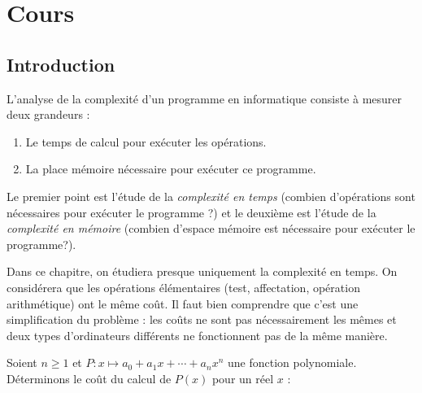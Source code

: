 \documentclass[french,11pt,twoside]{VcCours}
\begin{document}

\tableofcontents
\separationTitre


\section{Cours}

\subsection{Introduction}

L'analyse de la complexité d'un programme en informatique consiste 
à mesurer deux grandeurs :

\begin{enumerate}
\item Le temps de calcul pour exécuter les opérations.
\item La place mémoire nécessaire pour exécuter ce programme.
\end{enumerate}

\medskip 

Le premier point est l'étude de la \emph{complexité en temps} 
(combien d'opérations sont nécessaires pour exécuter le programme ?) 
et le deuxième est l'étude de la \emph{complexité en mémoire} 
(combien d'espace mémoire est nécessaire pour exécuter le programme?). 

\medskip

Dans ce chapitre, on étudiera presque uniquement la complexité en temps. 
On considérera que les opérations élémentaires (test, affectation, 
opération arithmétique) ont le même coût. Il faut bien comprendre que c'est 
une simplification du problème : les coûts ne sont pas nécessairement 
les mêmes et deux types d'ordinateurs différents ne fonctionnent pas 
de la même manière.

\medskip

\begin{Exercice}{} Soient $n \geq 1$ et 
$P : x \mapsto a_0 + a_1 x + \cdots + a_n x^n$ une fonction polynomiale. 
Déterminons le coût du calcul de $P(x)$ pour un réel $x$ :

\vspace*{4cm}

%
\end{Exercice}
\end{document}
